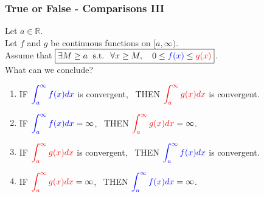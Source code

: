 \documentclass[14pt]{beamer}
\begin{document}
	\begin{frame}[t]
		\fontsize{11}{11}\selectfont
		\frametitle{True or False - Comparisons III}

		Let $a \in \mathbb{R}$. \\ Let $f$ and $g$ be continuous functions on
		$[a, \infty)$. \\ Assume that $\displaystyle \boxed{\exists M \geq a \; \text{ s.t. } \; \forall x \geq M, \quad 0 \leq {\color{blue} f(x)} \leq {\color{red} g(x)}}$.
		\\ What can we conclude?

		\begin{enumerate}
			\item IF $\displaystyle{\color{blue} \int_a^{\infty} f(x) dx}$ is convergent,
				\, THEN $\displaystyle{\color{red} \int_a^{\infty} g(x) dx}$ is
				convergent.

			\item IF $\displaystyle{\color{blue} \int_a^{\infty} f(x) dx}= \infty$, \,
				THEN $\displaystyle{\color{red} \int_a^{\infty} g(x) dx}= \infty$.

			\item IF $\displaystyle{\color{red} \int_a^{\infty} g(x) dx}$ is convergent,
				\, THEN $\displaystyle{\color{blue} \int_a^{\infty} f(x) dx}$ is
				convergent.

			\item IF $\displaystyle{\color{red} \int_a^{\infty} g(x) dx}= \infty$, \,
				THEN $\displaystyle{\color{blue} \int_a^{\infty} f(x) dx}= \infty$.
		\end{enumerate}
	\end{frame}
\end{document}
